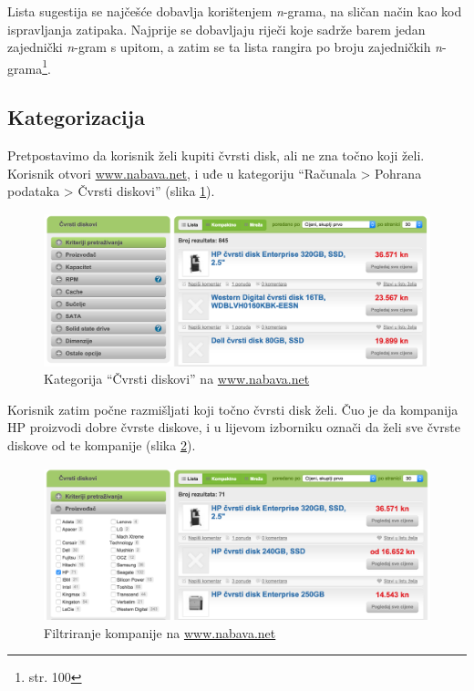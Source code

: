 \documentclass[a4paper,twoside,12pt]{scrreprt}
\begin{document}
Lista sugestija se najčešće dobavlja korištenjem \textit{n}-grama, na sličan način kao kod ispravljanja zatipaka. Najprije se dobavljaju riječi koje sadrže barem jedan zajednički \textit{n}-gram s upitom, a zatim se ta lista rangira po broju zajedničkih \textit{n}-grama\footnote{\cite{taming} str. 100}.

\subsection{Kategorizacija}

Pretpostavimo da korisnik želi kupiti čvrsti disk, ali ne zna točno koji želi. Korisnik otvori \url{www.nabava.net}, i uđe u kategoriju ``Računala > Pohrana podataka > Čvrsti diskovi'' (slika \ref{nabava1}).

\begin{figure}[H]
  \centering
  \includegraphics[width=\textwidth]{nabava1}
  \caption{Kategorija ``Čvrsti diskovi'' na \url{www.nabava.net}}
  \label{nabava1}
\end{figure}

Korisnik zatim počne razmišljati koji točno čvrsti disk želi. Čuo je da kompanija HP proizvodi dobre čvrste diskove, i u lijevom izborniku označi da želi sve čvrste diskove od te kompanije (slika \ref{nabava2}).

\begin{figure}[H]
  \centering
  \includegraphics[width=\textwidth]{nabava2}
  \caption{Filtriranje kompanije na \url{www.nabava.net}}
  \label{nabava2}
\end{figure}
\end{document}
